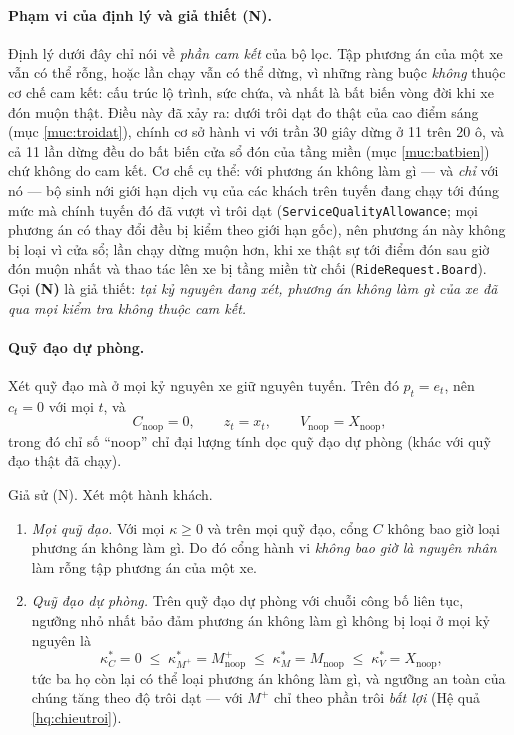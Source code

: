 \paragraph{Phạm vi của định lý và giả thiết (N).} Định lý dưới đây chỉ nói về \emph{phần cam kết}
của bộ lọc. Tập phương án của một xe vẫn có thể rỗng, hoặc lần chạy vẫn có thể dừng, vì những ràng
buộc \emph{không} thuộc cơ chế cam kết: cấu trúc lộ trình, sức chứa, và nhất là bất biến vòng đời
khi xe đón muộn thật. Điều này đã xảy ra: dưới trôi dạt đo thật của cao điểm sáng (mục
\ref{muc:troidat}), chính cơ sở hành vi với trần 30 giây dừng ở 11 trên 20 ô, và cả 11 lần dừng
đều do bất biến cửa sổ đón của tầng miền (mục \ref{muc:batbien}) chứ không do cam kết. Cơ chế cụ
thể: với phương án không làm gì --- và \emph{chỉ} với nó --- bộ sinh nới giới hạn dịch vụ của các
khách trên tuyến đang chạy tới đúng mức mà chính tuyến đó đã vượt vì trôi dạt
(\texttt{ServiceQualityAllowance}; mọi phương án có thay đổi đều bị kiểm theo giới hạn gốc), nên
phương án này không bị loại vì cửa sổ; lần chạy dừng muộn hơn, khi xe thật sự tới điểm đón sau giờ đón muộn nhất
và thao tác lên xe bị tầng miền từ chối (\texttt{RideRequest.Board}). Gọi \textbf{(N)} là giả
thiết: \emph{tại kỷ nguyên đang xét, phương án không làm gì của xe đã qua mọi kiểm tra không thuộc
cam kết.}

\paragraph{Quỹ đạo dự phòng.} Xét quỹ đạo mà ở mọi kỷ nguyên xe giữ nguyên tuyến. Trên đó
$p_t = e_t$, nên $c_t = 0$ với mọi $t$, và
\[
C_{\text{noop}} = 0, \qquad z_t = x_t, \qquad V_{\text{noop}} = X_{\text{noop}} ,
\]
trong đó chỉ số ``noop'' chỉ đại lượng tính dọc quỹ đạo dự phòng (khác với quỹ đạo thật đã chạy).

\begin{dinhly}
\label{dl:hocong}
Giả sử (N). Xét một hành khách.
\begin{enumerate}[label=(\alph*),leftmargin=1cm,itemsep=2pt,topsep=3pt]
\item \emph{Mọi quỹ đạo.} Với mọi $\kappa \ge 0$ và trên mọi quỹ đạo, cổng $C$ không bao giờ loại
phương án không làm gì. Do đó cổng hành vi \emph{không bao giờ là nguyên nhân} làm rỗng tập phương
án của một xe.
\item \emph{Quỹ đạo dự phòng.} Trên quỹ đạo dự phòng với chuỗi công bố liên tục, ngưỡng nhỏ nhất
bảo đảm phương án không làm gì không bị loại ở mọi kỷ nguyên là
\[
\kappa^{*}_{C} = 0 \;\le\; \kappa^{*}_{M^{+}} = M^{+}_{\text{noop}} \;\le\;
\kappa^{*}_{M} = M_{\text{noop}} \;\le\; \kappa^{*}_{V} = X_{\text{noop}} ,
\]
tức ba họ còn lại có thể loại phương án không làm gì, và ngưỡng an toàn của chúng tăng theo độ
trôi dạt --- với $M^{+}$ chỉ theo phần trôi \emph{bất lợi} (Hệ quả \ref{hq:chieutroi}).
\end{enumerate}
\end{dinhly}

